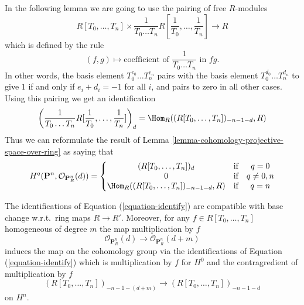 \noindent
In the following lemma we are going to use the pairing of free
$R$-modules
$$
R[T_0, \ldots, T_n]
\times
\frac{1}{T_0 \ldots T_n} R[\frac{1}{T_0}, \ldots, \frac{1}{T_n}]
\longrightarrow
R
$$
which is defined by the rule
$$
(f, g)
\longmapsto
\text{coefficient of }
\frac{1}{T_0 \ldots T_n}
\text{ in }fg.
$$
In other words, the basis element $T_0^{e_0} \ldots T_n^{e_n}$ pairs
with the basis element $T_0^{d_0} \ldots T_n^{d_n}$ to give $1$ if and only
if $e_i + d_i = -1$ for all $i$, and pairs to zero in all other cases.
Using this pairing we get an identification
$$
\left(\frac{1}{T_0 \ldots T_n} R[\frac{1}{T_0}, \ldots, \frac{1}{T_n}]\right)_d
=
\Hom_R((R[T_0, \ldots, T_n])_{-n - 1 - d}, R)
$$
Thus we can reformulate the result of
Lemma \ref{lemma-cohomology-projective-space-over-ring} as saying that
\begin{equation}
\label{equation-identify}
H^q(\mathbf{P}^n, \mathcal{O}_{\mathbf{P}^n_R}(d)) =
\left\{
\begin{matrix}
(R[T_0, \ldots, T_n])_d & \text{if} & q = 0 \\
0 & \text{if} & q \not = 0, n \\
\Hom_R((R[T_0, \ldots, T_n])_{-n - 1 - d}, R)
& \text{if} & q = n
\end{matrix}
\right.
\end{equation}

\begin{lemma}
\label{lemma-identify-functorially}
The identifications of Equation (\ref{equation-identify}) are
compatible with base change w.r.t.\ ring maps $R \to R'$.
Moreover, for any $f \in R[T_0, \ldots, T_n]$ homogeneous
of degree $m$ the map multiplication by $f$
$$
\mathcal{O}_{\mathbf{P}^n_R}(d)
\longrightarrow
\mathcal{O}_{\mathbf{P}^n_R}(d + m)
$$
induces the map on the cohomology group via the identifications
of Equation (\ref{equation-identify}) which is multiplication by
$f$ for $H^0$ and the contragredient of multiplication by $f$
$$
(R[T_0, \ldots, T_n])_{-n - 1 - (d + m)}
\longrightarrow
(R[T_0, \ldots, T_n])_{-n - 1 - d}
$$
on $H^n$.
\end{lemma}

